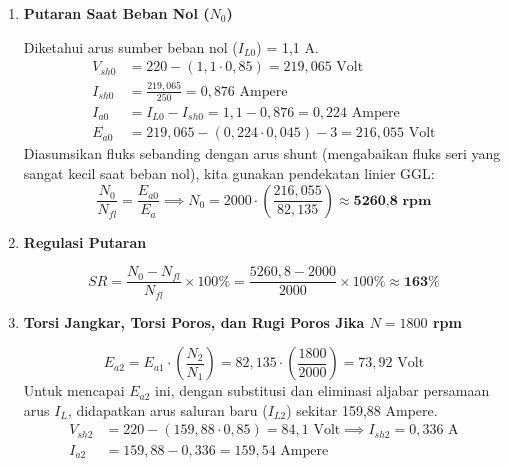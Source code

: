 \documentclass[12pt, a4paper]{article}
\begin{document}
\begin{enumerate}[label=\alph*.]
    Karena ini adalah motor (disuplai oleh tegangan jala-jala yang konstan 220V), regulasi tegangan terminal adalah \textbf{0\%}.

    \vspace{0.3cm}

    \item \textbf{Putaran Saat Beban Nol ($N_0$)}

    Diketahui arus sumber beban nol ($I_{L0}$) = 1,1 A.
    \begin{align*}
        V_{sh0} &= 220 - (1,1 \cdot 0,85) = 219,065 \text{ Volt} \\
        I_{sh0} &= \frac{219,065}{250} = 0,876 \text{ Ampere} \\
        I_{a0} &= I_{L0} - I_{sh0} = 1,1 - 0,876 = 0,224 \text{ Ampere} \\
        E_{a0} &= 219,065 - (0,224 \cdot 0,045) - 3 = 216,055 \text{ Volt}
    \end{align*}
    Diasumsikan fluks sebanding dengan arus shunt (mengabaikan fluks seri yang sangat kecil saat beban nol), kita gunakan pendekatan linier GGL:
    \[
        \frac{N_0}{N_{fl}} = \frac{E_{a0}}{E_a} \implies N_0 = 2000 \cdot \left(\frac{216,055}{82,135}\right) \approx \textbf{5260,8 rpm}
    \]

    \vspace{0.3cm}

    \item \textbf{Regulasi Putaran}

    \[
        SR = \frac{N_0 - N_{fl}}{N_{fl}} \times 100\% = \frac{5260,8 - 2000}{2000} \times 100\% \approx \textbf{163\%}
    \]

    \vspace{0.3cm}

    \item \textbf{Torsi Jangkar, Torsi Poros, dan Rugi Poros Jika $N = 1800$ rpm}

    \[
        E_{a2} = E_{a1} \cdot \left(\frac{N_2}{N_1}\right) = 82,135 \cdot \left(\frac{1800}{2000}\right) = 73,92 \text{ Volt}
    \]
    Untuk mencapai $E_{a2}$ ini, dengan substitusi dan eliminasi aljabar persamaan arus $I_L$, didapatkan arus saluran baru ($I_{L2}$) sekitar 159,88 Ampere.
    \begin{align*}
        V_{sh2} &= 220 - (159,88 \cdot 0,85) = 84,1 \text{ Volt} \implies I_{sh2} = 0,336 \text{ A} \\
        I_{a2} &= 159,88 - 0,336 = 159,54 \text{ Ampere}
    \end{align*}


\end{enumerate}
\end{document}
